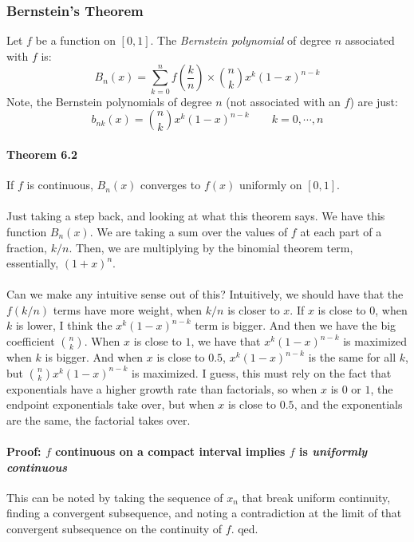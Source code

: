 \documentclass[12pt,a4paper]{article}
\newcommand{\1}[1]{\mathbbm{1}\left\{ #1 \right\}}
\begin{document}
\subsubsection{Bernstein's Theorem} Let $f$ be a function on $[0,1]$. The \textit{Bernstein polynomial} of degree $n$ associated with $f$ is:
$$
	B_n(x) = \sum_{k=0}^n f\left(\frac{k}{n}\right) \times {n \choose k} x^k(1-x)^{n-k}
$$
Note, the Bernstein polynomials of degree $n$ (not associated with an $f$) are just:
$$
	b_{nk}(x) = {n \choose k} x^k(1-x)^{n-k} \quad\quad k = 0, \cdots, n
$$

\paragraph{Theorem 6.2} If $f$ is continuous, $B_n(x)$ converges to $f(x)$ uniformly on $[0,1]$.
\\\\
Just taking a step back, and looking at what this theorem says. We have this function $B_n(x)$. We are taking a sum over the values of $f$ at each part of a fraction, $k/n$. Then, we are multiplying by the binomial theorem term, essentially, $(1+x)^n$. 
\\\\
Can we make any intuitive sense out of this? Intuitively, we should have that the $f(k/n)$ terms have more weight, when $k/n$ is closer to $x$. If $x$ is close to $0$, when $k$ is lower, I think the $x^k(1-x)^{n-k}$ term is bigger. And then we have the big coefficient ${n \choose k}$. When $x$ is close to $1$, we have that $x^k(1-x)^{n-k}$ is maximized when $k$ is bigger. And when $x$ is close to $0.5$, $x^k(1-x)^{n-k}$ is the same for all $k$, but ${n \choose k}x^k(1-x)^{n-k}$ is maximized. I guess, this must rely on the fact that exponentials have a higher growth rate than factorials, so when $x$ is $0$ or $1$, the endpoint exponentials take over, but when $x$ is close to $0.5$, and the exponentials are the same, the factorial takes over.

\paragraph{Proof: $f$ continuous on a compact interval implies $f$ is \textit{uniformly continuous}} This can be noted by taking the sequence of $x_n$ that break uniform continuity, finding a convergent subsequence, and noting a contradiction at the limit of that convergent subsequence on the continuity of $f$. qed.
\end{document}
